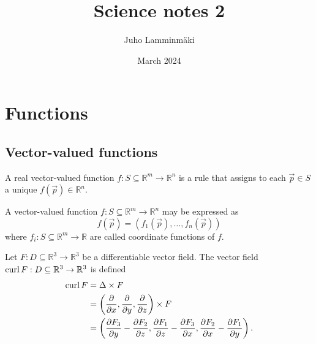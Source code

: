 \documentclass{article}
\title{Science notes 2}
\author{Juho Lamminmäki }
\date{March 2024}
\begin{document}
\maketitle

\section{Functions}
\subsection{Vector-valued functions}
\begin{definition}
    A real vector-valued function $f: S \subseteq \mathbb{R}^m \rightarrow \mathbb{R}^n$
    is a rule that assigns to each $\vec{p} \in S$ a unique $f(\vec{p}) \in \mathbb{R}^n$.
\end{definition}
\begin{definition}
    A vector-valued function $f: S \subseteq \mathbb{R}^m \rightarrow \mathbb{R}^n$ may be expressed
    as
    \begin{equation}
        f(\vec{p}) = (f_1(\vec{p}), \ldots, f_n(\vec{p}))
    \end{equation}
    where $f_i: S \subseteq \mathbb{R}^m \rightarrow \mathbb{R}$ are called coordinate functions of $f$.
\end{definition}
\begin{definition}[Curl]
    Let $F: D \subseteq \mathbb{R}^3 \rightarrow \mathbb{R}^3$ be a differentiable vector field.
    The vector field $\operatorname{curl} F:  D \subseteq \mathbb{R}^3 \rightarrow \mathbb{R}^3$ is defined
    \begin{align}
        \operatorname{curl} F & = \Delta \times F                                                                                             \\
                & = \left(\frac{\partial}{\partial x}, \frac{\partial}{\partial y}, \frac{\partial}{\partial z}\right) \times F \\
                & = \left(\frac{\partial F_3}{\partial y} - \frac{\partial F_2}{\partial z},
        \frac{\partial F_1}{\partial z} - \frac{\partial F_3}{\partial x},
        \frac{\partial F_2}{\partial x} - \frac{\partial F_1}{\partial y} \right).
    \end{align}
\end{definition}
\end{document}

